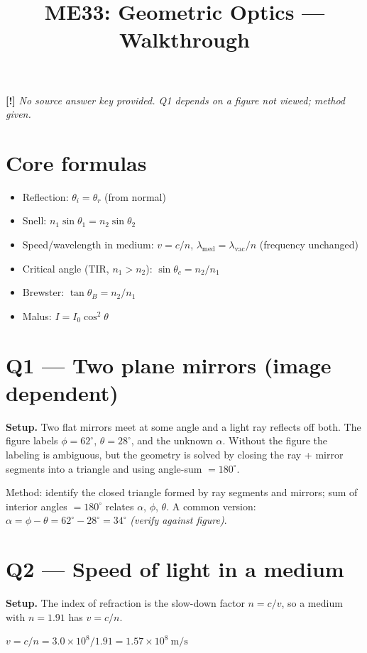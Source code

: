 \documentclass[11pt]{article}
\title{ME33: Geometric Optics --- Walkthrough}
\author{}\date{}
\newcommand{\warn}{\textbf{[!]}}
\begin{document}
\maketitle

\warn{} \emph{No source answer key provided. Q1 depends on a figure not viewed; method given.}

\section*{Core formulas}
\begin{itemize}[leftmargin=*]
\item Reflection: $\theta_i = \theta_r$ (from normal)
\item Snell: $n_1\sin\theta_1 = n_2\sin\theta_2$
\item Speed/wavelength in medium: $v = c/n$, $\lambda_{\text{med}} = \lambda_{\text{vac}}/n$ (frequency unchanged)
\item Critical angle (TIR, $n_1>n_2$): $\sin\theta_c = n_2/n_1$
\item Brewster: $\tan\theta_B = n_2/n_1$
\item Malus: $I = I_0\cos^2\theta$
\end{itemize}

\section*{Q1 --- Two plane mirrors (image dependent)}
\textbf{Setup.} Two flat mirrors meet at some angle and a light ray reflects off both. The figure labels $\phi=62^\circ$, $\theta=28^\circ$, and the unknown $\alpha$. Without the figure the labeling is ambiguous, but the geometry is solved by closing the ray + mirror segments into a triangle and using angle-sum $=180^\circ$.

Method: identify the closed triangle formed by ray segments and mirrors; sum of interior angles $= 180^\circ$ relates $\alpha$, $\phi$, $\theta$. A common version: $\alpha = \phi - \theta = 62^\circ - 28^\circ = \boxed{34^\circ}$ \emph{(verify against figure)}.

\section*{Q2 --- Speed of light in a medium}
\textbf{Setup.} The index of refraction is the slow-down factor $n=c/v$, so a medium with $n=1.91$ has $v=c/n$.

$v = c/n = 3.0\times10^8/1.91 = \boxed{1.57\times 10^8\ \text{m/s}}$
\end{document}
